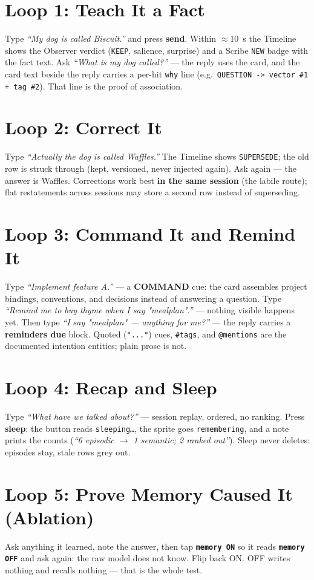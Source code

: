 \section{Loop 1: Teach It a Fact}
Type \emph{``My dog is called Biscuit.''} and press \textbf{send}. Within $\approx$10~s the
Timeline shows the Observer verdict (\texttt{KEEP}, salience, surprise) and a Scribe
\texttt{NEW} badge with the fact text. Ask \emph{``What is my dog called?''} --- the reply
uses the card, and the card text beside the reply carries a per-hit \texttt{why} line
(e.g.\ \texttt{QUESTION -> vector \#1 + tag \#2}). That line is the proof of association.

\section{Loop 2: Correct It}
Type \emph{``Actually the dog is called Waffles.''} The Timeline shows \texttt{SUPERSEDE};
the old row is struck through (kept, versioned, never injected again). Ask again --- the
answer is Waffles. Corrections work best \textbf{in the same session} (the labile route);
flat restatements across sessions may store a second row instead of superseding.

\section{Loop 3: Command It and Remind It}
Type \emph{``Implement feature A.''} --- a \textbf{COMMAND} cue: the card assembles project
bindings, conventions, and decisions instead of answering a question. Type
\emph{``Remind me to buy thyme when I say "mealplan".''} --- nothing visible happens yet.
Then type \emph{``I say "mealplan" --- anything for me?''} --- the reply carries a
\textbf{reminders due} block. Quoted (\texttt{"..."}) cues, \texttt{\#tags}, and
\texttt{@mentions} are the documented intention entities; plain prose is not.

\section{Loop 4: Recap and Sleep}
Type \emph{``What have we talked about?''} --- session replay, ordered, no ranking. Press
\textbf{sleep}: the button reads \texttt{sleeping\ldots}, the sprite goes
\texttt{remembering}, and a note prints the counts (\emph{``6 episodic $\rightarrow$
1 semantic; 2 ranked out''}). Sleep never deletes: episodes stay, stale rows grey out.

\section{Loop 5: Prove Memory Caused It (Ablation)}
Ask anything it learned, note the answer, then tap \textbf{\texttt{memory ON}} so it reads
\textbf{\texttt{memory OFF}} and ask again: the raw model does not know. Flip back ON.
OFF writes nothing and recalls nothing --- that is the whole test.

